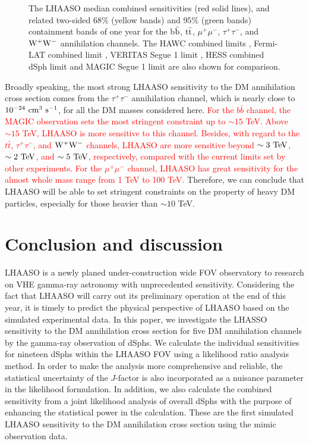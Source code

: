 \documentclass[12pt,aps,prd,amsmath,amssymb,showpacs,floats,floatfix,nofootinbib]{revtex4-1}
\def\red#1{{\textcolor{red}{#1}}} %
\begin{document}
\begin{figure}
\caption{The LHAASO median combined sensitivities (red solid lines), and related two-sided $68\%$ (yellow bands) and $95\%$ (green bands) containment bands of one year for the b$\bar{\rm b}$, $\rm t\bar{\rm t}$, $\mu^{+}\mu^{-}$, $\tau^+\tau^-$, and $\rm W^+W^-$ annihilation channels. The HAWC combined limits \cite{Albert:2017vtb}, Fermi-LAT combined limit \cite{Ackermann:2013yva}, VERITAS Segue 1 limit \cite{Aliu:2012ga}, HESS combined dSph limit \cite{Abramowski:2014tra} and MAGIC Segue 1 limit \cite{Ahnen:2016qkx} are also shown for comparison. }
\label{fig:Lhaaso-combined}
\end{figure}

Broadly speaking, the most strong LHAASO sensitivity to the DM annihilation cross section comes from the $\tau^{+}\tau^{-}$ annihilation channel, which is nearly close to $10^{-24}~\rm cm^{3}~s^{-1}$, for all the DM masses considered here. \red{For the $b\bar{b}$ channel, the MAGIC observation sets the most stringent constraint up to $\sim15$ TeV. Above $\sim15$ TeV, LHAASO is more sensitive to this channel. Besides, with regard to the $t\bar{t}$, $\tau^+\tau^-$, and $\rm W^+W^-$ channels, LHAASO are more sensitive beyond $\sim3 ~\rm TeV$, $\sim2 ~\rm TeV$, and $\sim 5 ~\rm TeV$, respectively, compared with the current limits set by other experiments.
For the $\mu^{+}\mu^{-}$ channel, LHAASO has great sensitivity for the almost whole mass range from 1 TeV to 100 TeV.} Therefore, we can conclude that LHAASO will be able to set stringent constraints on the property of heavy DM particles, especially for those heavier than $\sim 10$ TeV.

\section{Conclusion and discussion}\label{sec:conclu}
LHAASO is a newly planed under-construction wide FOV observatory to research on VHE gamma-ray astronomy with unprecedented sensitivity. Considering the fact that LHAASO will carry out its preliminary operation at the end of this year, it is timely to predict the physical perspective of LHAASO based on the simulated experimental data.
In this paper, we investigate the LHASSO sensitivity to the DM annihilation cross section for five DM annihilation channels by the gamma-ray observation of dSphs. We calculate the individual sensitivities for nineteen dSphs within the LHAASO FOV using a likelihood ratio analysis method. In order to make the analysis more comprehensive and reliable, the statistical uncertainty of the $J$-factor is also incorporated as a nuisance parameter in the likelihood formulation.
In addition, we also calculate the combined sensitivity from a joint likelihood analysis of overall dSphs with the purpose of enhancing the statistical power in the calculation. These are the first simulated LHAASO sensitivity to the DM annihilation cross section using the mimic observation data.
\end{document}
